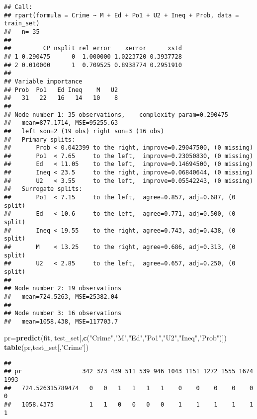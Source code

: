 \documentclass[]{article}
\newenvironment{Shaded}{\begin{snugshade}}{\end{snugshade}}
\newcommand{\KeywordTok}[1]{\textcolor[rgb]{0.13,0.29,0.53}{\textbf{#1}}}
\newcommand{\NormalTok}[1]{#1}
\newcommand{\StringTok}[1]{\textcolor[rgb]{0.31,0.60,0.02}{#1}}
\begin{document}
\begin{verbatim}
## Call:
## rpart(formula = Crime ~ M + Ed + Po1 + U2 + Ineq + Prob, data = train_set)
##   n= 35 
## 
##         CP nsplit rel error    xerror      xstd
## 1 0.290475      0  1.000000 1.0223720 0.3937728
## 2 0.010000      1  0.709525 0.8938774 0.2951910
## 
## Variable importance
## Prob  Po1   Ed Ineq    M   U2 
##   31   22   16   14   10    8 
## 
## Node number 1: 35 observations,    complexity param=0.290475
##   mean=877.1714, MSE=95255.63 
##   left son=2 (19 obs) right son=3 (16 obs)
##   Primary splits:
##       Prob < 0.042399 to the right, improve=0.29047500, (0 missing)
##       Po1  < 7.65     to the left,  improve=0.23050830, (0 missing)
##       Ed   < 11.05    to the left,  improve=0.14694500, (0 missing)
##       Ineq < 23.5     to the right, improve=0.06840644, (0 missing)
##       U2   < 3.55     to the left,  improve=0.05542243, (0 missing)
##   Surrogate splits:
##       Po1  < 7.15     to the left,  agree=0.857, adj=0.687, (0 split)
##       Ed   < 10.6     to the left,  agree=0.771, adj=0.500, (0 split)
##       Ineq < 19.55    to the right, agree=0.743, adj=0.438, (0 split)
##       M    < 13.25    to the right, agree=0.686, adj=0.313, (0 split)
##       U2   < 2.85     to the left,  agree=0.657, adj=0.250, (0 split)
## 
## Node number 2: 19 observations
##   mean=724.5263, MSE=25382.04 
## 
## Node number 3: 16 observations
##   mean=1058.438, MSE=117703.7
\end{verbatim}

\begin{Shaded}
\begin{Highlighting}[]
\NormalTok{pr=}\KeywordTok{predict}\NormalTok{(fit, test_set[,}\KeywordTok{c}\NormalTok{(}\StringTok{"Crime"}\NormalTok{,}\StringTok{"M"}\NormalTok{,}\StringTok{"Ed"}\NormalTok{,}\StringTok{"Po1"}\NormalTok{,}\StringTok{"U2"}\NormalTok{,}\StringTok{"Ineq"}\NormalTok{,}\StringTok{"Prob"}\NormalTok{)])}
\KeywordTok{table}\NormalTok{(pr,test_set[,}\StringTok{'Crime'}\NormalTok{])}
\end{Highlighting}
\end{Shaded}

\begin{verbatim}
##                   
## pr                 342 373 439 511 539 946 1043 1151 1272 1555 1674 1993
##   724.526315789474   0   0   1   1   1   1    0    0    0    0    0    0
##   1058.4375          1   1   0   0   0   0    1    1    1    1    1    1
\end{verbatim}
\end{document}
